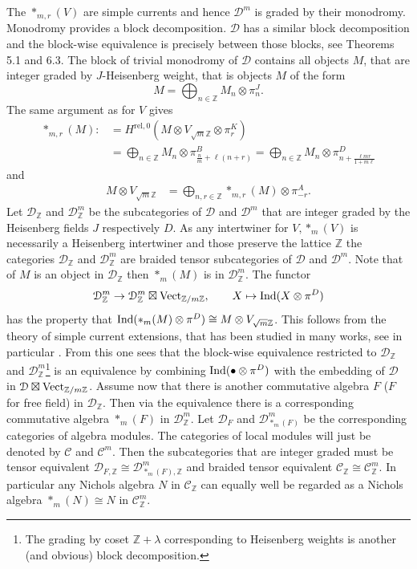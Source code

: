 \documentclass[a4paper, reqno]{amsart}
\theoremstyle{introTheorems}
\newcommand\cC{\mathcal{C}}
\newcommand\cD{\mathcal{D}}
\newcommand{\Ind}{\textup{Ind}}
\newcommand{\Vect}{\textup{Vect}}
\renewcommand{\1}{\mathbbold{1}}
\begin{document}
The $*_{m, r}(V)$ are simple currents \cite{CKLR} and hence $\cD^m$ is graded by their monodromy. Monodromy provides a block decomposition. $\cD$ has a similar block decomposition and the block-wise equivalence is precisely between those blocks, see \cite{CGNS} Theorems 5.1 and 6.3. The block of trivial monodromy of $\cD$ contains all objects $M$, that are integer graded by $J$-Heisenberg weight, that is objects $M$ of the form
\[
M = \bigoplus_{n \in \mathbb Z} M_n \otimes \pi^J_n.
\]
The same argument as for $V$ gives 
\begin{align*} \nonumber 
     *_{m, r}(M) :&=  H^{\mathrm{rel},0}(M \otimes V_{\sqrt{m}\mathbb Z} \otimes \pi^{K}_r)\\
     &= \bigoplus_{n\in \mathbb Z} M_{n} \otimes \pi^B_{\frac{n}{m} + \ell (n+r)} = \bigoplus_{n\in \mathbb Z} M_{n} \otimes \pi^D_{n + \frac{\ell m  r}{1+m\ell}}  
\end{align*}
and 
\begin{align*}
    M \otimes V_{\sqrt{m}\mathbb Z} &= \bigoplus_{n, r \in \mathbb Z} *_{m, r}(M)  \otimes  \pi^A_{-r}.
\end{align*}
Let $\cD_{\mathbb Z}$ and $\cD^m_{\mathbb Z}$ be the subcategories of $\cD$ and $\cD^m$ that are integer graded by the Heisenberg fields $J$ respectively $D$. As any intertwiner for $V, *_m(V)$ is necessarily a Heisenberg intertwiner and those preserve the lattice $\mathbb Z$ the categories  $\cD_{\mathbb Z}$ and $\cD^m_{\mathbb Z}$ are braided tensor subcategories of 
$\cD$ and $\cD^m$. Note that of $M$ is an object in $\cD_{\mathbb Z}$ then $*_m(M)$ is in $\cD^m_{\mathbb Z}$. 
The functor
\[
\cD^m_{\mathbb Z} \rightarrow \cD^m_{\mathbb Z} \boxtimes \Vect_{\mathbb Z/m\mathbb Z}, \qquad  X \mapsto \Ind(X \otimes \pi^D) 
\]
has the property that $\Ind(*_m(M)\otimes \pi^D)\cong M \otimes V_{\sqrt{m}\mathbb Z}$. This follows from the theory of simple current extensions, that has been studied in many works, see in particular \cites{CMYsc1, CMYsc2}. From this one sees that the block-wise equivalence restricted to $\cD_{\mathbb Z}$ and $\cD^m_{\mathbb Z}$\footnote{The grading by coset $\mathbb Z+\lambda$ corresponding to Heisenberg weights is another (and obvious) block decomposition.} is an equivalence by combining $\Ind( \bullet \otimes \pi^D)$ with the embedding of $\cD$ in $\cD \boxtimes \Vect_{\mathbb Z/m\mathbb Z}$.
Assume now that there is another commutative algebra $F$ ($F$ for free field) in $\cD_{\mathbb Z}$. Then via the equivalence there is a corresponding commutative algebra $*_m(F)$ in  $\cD^m_{\mathbb Z}$. Let $\cD_F$ and $\cD^m_{*_m(F)}$ be the corresponding categories of algebra modules. The categories of local modules will just be denoted by $\cC$ and $\cC^m$. Then the subcategories that are integer graded must be tensor equivalent $\cD_{F, \mathbb Z} \cong \cD^m_{*_m(F), \mathbb Z}$ and braided tensor equivalent $\cC_{\mathbb Z} \cong \cC^m_{\mathbb Z}$. In particular any Nichols algebra $N$ in $\cC_{\mathbb Z}$ can equally well be regarded as a Nichols algebra $*_m(N) \cong N$ in $\cC^m_{\mathbb Z}$.
\end{document}
